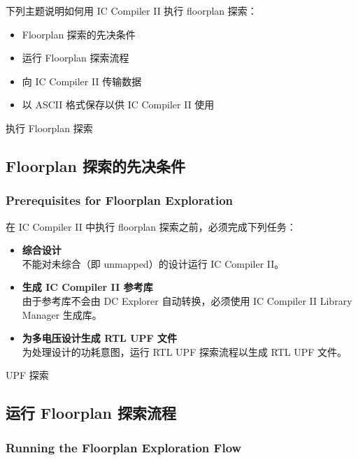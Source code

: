 下列主题说明如何用 IC Compiler II 执行 floorplan 探索：
\begin{itemize}
  \item Floorplan 探索的先决条件
  \item 运行 Floorplan 探索流程
  \item 向 IC Compiler II 传输数据
  \item 以 ASCII 格式保存以供 IC Compiler II 使用
\end{itemize}

\begin{seeAlsoBox}
执行 Floorplan 探索
\end{seeAlsoBox}

\subsection{Floorplan 探索的先决条件}
\subsubsection*{Prerequisites for Floorplan Exploration}

在 IC Compiler II 中执行 floorplan 探索之前，必须完成下列任务：
\begin{itemize}
  \item \textbf{综合设计}\\
        不能对未综合（即 unmapped）的设计运行 IC Compiler II。
  \item \textbf{生成 IC Compiler II 参考库}\\
        由于参考库不会由 DC Explorer 自动转换，必须使用 IC Compiler II Library Manager 生成库。
  \item \textbf{为多电压设计生成 RTL UPF 文件}\\
        为处理设计的功耗意图，运行 RTL UPF 探索流程以生成 RTL UPF 文件。
\end{itemize}

\begin{seeAlsoBox}
UPF 探索
\end{seeAlsoBox}

\subsection{运行 Floorplan 探索流程}
\subsubsection*{Running the Floorplan Exploration Flow}

